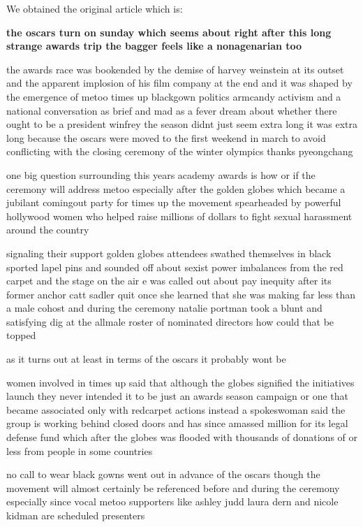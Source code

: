 We obtained the original article which is:\\
{\bfseries
the oscars turn  on sunday which seems about right after this long strange
awards trip the bagger feels like a nonagenarian too

the awards race was bookended by the demise of harvey weinstein at its outset
and the apparent implosion of his film company at the end and it was shaped by
the emergence of metoo times up blackgown politics armcandy activism and
a national conversation as brief and mad as a fever dream about whether there
ought to be a president winfrey the season didnt just seem extra long it was
extra long because the oscars were moved to the first weekend in march to
avoid conflicting with the closing ceremony of the winter olympics thanks
pyeongchang

one big question surrounding this years academy awards is how or if the
ceremony will address metoo especially after the golden globes which became
a jubilant comingout party for times up the movement spearheaded by 
powerful hollywood women who helped raise millions of dollars to fight sexual
harassment around the country

signaling their support golden globes attendees swathed themselves in black
sported lapel pins and sounded off about sexist power imbalances from the red
carpet and the stage on the air e was called out about pay inequity after
its former anchor catt sadler quit once she learned that she was making far
less than a male cohost and during the ceremony natalie portman took a blunt
and satisfying dig at the allmale roster of nominated directors how could
that be topped

as it turns out at least in terms of the oscars it probably wont be

women involved in times up said that although the globes signified the
initiatives launch they never intended it to be just an awards season
campaign or one that became associated only with redcarpet actions instead
a spokeswoman said the group is working behind closed doors and has since
amassed  million for its legal defense fund which after the globes was
flooded with thousands of donations of  or less from people in some 
countries


no call to wear black gowns went out in advance of the oscars though the
movement will almost certainly be referenced before and during the ceremony 
especially since vocal metoo supporters like ashley judd laura dern and
nicole kidman are scheduled presenters

}
